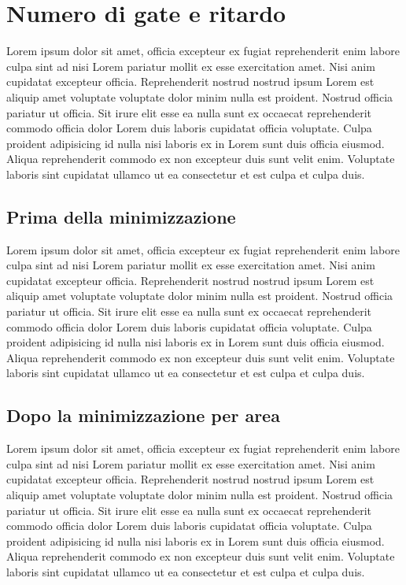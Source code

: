 \documentclass[a4paper]{article}
\begin{document}
\section{Numero di gate e ritardo}
Lorem ipsum dolor sit amet, officia excepteur ex fugiat reprehenderit enim labore culpa sint ad nisi Lorem pariatur mollit ex esse exercitation amet. Nisi anim cupidatat excepteur officia. Reprehenderit nostrud nostrud ipsum Lorem est aliquip amet voluptate voluptate dolor minim nulla est proident. Nostrud officia pariatur ut officia. Sit irure elit esse ea nulla sunt ex occaecat reprehenderit commodo officia dolor Lorem duis laboris cupidatat officia voluptate. Culpa proident adipisicing id nulla nisi laboris ex in Lorem sunt duis officia eiusmod. Aliqua reprehenderit commodo ex non excepteur duis sunt velit enim. Voluptate laboris sint cupidatat ullamco ut ea consectetur et est culpa et culpa duis.

\subsection{Prima della minimizzazione}
Lorem ipsum dolor sit amet, officia excepteur ex fugiat reprehenderit enim labore culpa sint ad nisi Lorem pariatur mollit ex esse exercitation amet. Nisi anim cupidatat excepteur officia. Reprehenderit nostrud nostrud ipsum Lorem est aliquip amet voluptate voluptate dolor minim nulla est proident. Nostrud officia pariatur ut officia. Sit irure elit esse ea nulla sunt ex occaecat reprehenderit commodo officia dolor Lorem duis laboris cupidatat officia voluptate. Culpa proident adipisicing id nulla nisi laboris ex in Lorem sunt duis officia eiusmod. Aliqua reprehenderit commodo ex non excepteur duis sunt velit enim. Voluptate laboris sint cupidatat ullamco ut ea consectetur et est culpa et culpa duis.

\subsection{Dopo la minimizzazione per area}
Lorem ipsum dolor sit amet, officia excepteur ex fugiat reprehenderit enim labore culpa sint ad nisi Lorem pariatur mollit ex esse exercitation amet. Nisi anim cupidatat excepteur officia. Reprehenderit nostrud nostrud ipsum Lorem est aliquip amet voluptate voluptate dolor minim nulla est proident. Nostrud officia pariatur ut officia. Sit irure elit esse ea nulla sunt ex occaecat reprehenderit commodo officia dolor Lorem duis laboris cupidatat officia voluptate. Culpa proident adipisicing id nulla nisi laboris ex in Lorem sunt duis officia eiusmod. Aliqua reprehenderit commodo ex non excepteur duis sunt velit enim. Voluptate laboris sint cupidatat ullamco ut ea consectetur et est culpa et culpa duis.
\end{document}
